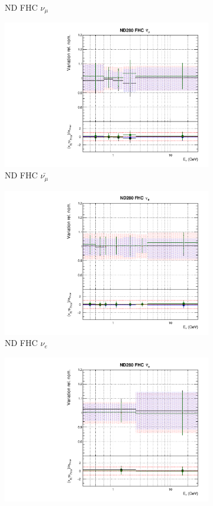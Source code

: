 \begin{figure}[t]
\begin{subfigure}{0.45\textwidth}
  \caption{ND FHC $\nu_{\mu}$}
\end{subfigure}
\begin{subfigure}{0.45\textwidth}
  \centering
  \includegraphics[width=0.75\linewidth]{figs/hptpcfitsflux_1}
  \caption{ND FHC $\bar{\nu_{\mu}}$}
\end{subfigure}
\begin{subfigure}{0.45\textwidth}
  \centering
  \includegraphics[width=0.75\linewidth]{figs/hptpcfitsflux_2}
  \caption{ND FHC $\nu_e$}
\end{subfigure}
\begin{subfigure}{0.45\textwidth}
  \centering
  \includegraphics[width=0.75\linewidth]{figs/hptpcfitsflux_3}

\end{subfigure}
\end{figure}
